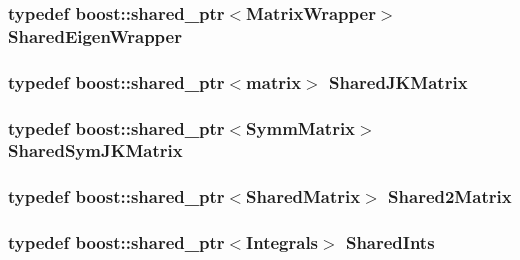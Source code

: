 \label{namespaceJKBuilder_a36fdf7f9a8c81e7ddac62fddb1996ab3}
\hypertarget{namespaceJKBuilder_ad018675eed9ebe499b95822286a7e912}{
\subsubsection[{SharedEigenWrapper}]{\setlength{\rightskip}{0pt plus 5cm}typedef boost::shared\_\-ptr$<${\bf MatrixWrapper}$>$ {\bf SharedEigenWrapper}}}
\label{namespaceJKBuilder_ad018675eed9ebe499b95822286a7e912}
\hypertarget{namespaceJKBuilder_ad6c4232cd3938548f4ad3a91fbc5a2e8}{
\subsubsection[{SharedJKMatrix}]{\setlength{\rightskip}{0pt plus 5cm}typedef boost::shared\_\-ptr$<${\bf matrix}$>$ {\bf SharedJKMatrix}}}
\label{namespaceJKBuilder_ad6c4232cd3938548f4ad3a91fbc5a2e8}
\hypertarget{namespaceJKBuilder_aef21bc37b7cf7bc5ebb5a48628db8d0f}{
\subsubsection[{SharedSymJKMatrix}]{\setlength{\rightskip}{0pt plus 5cm}typedef boost::shared\_\-ptr$<${\bf SymmMatrix}$>$ {\bf SharedSymJKMatrix}}}
\label{namespaceJKBuilder_aef21bc37b7cf7bc5ebb5a48628db8d0f}
\hypertarget{namespaceJKBuilder_a490b0a0cd0b0f8f0e280e29b03eb51a3}{
\subsubsection[{Shared2Matrix}]{\setlength{\rightskip}{0pt plus 5cm}typedef boost::shared\_\-ptr$<${\bf SharedMatrix}$>$ {\bf Shared2Matrix}}}
\label{namespaceJKBuilder_a490b0a0cd0b0f8f0e280e29b03eb51a3}
\hypertarget{namespaceJKBuilder_a5f21cc1a0cc795f1cb9aceca0400dcd0}{
\subsubsection[{SharedInts}]{\setlength{\rightskip}{0pt plus 5cm}typedef boost::shared\_\-ptr$<${\bf Integrals}$>$ {\bf SharedInts}}}

